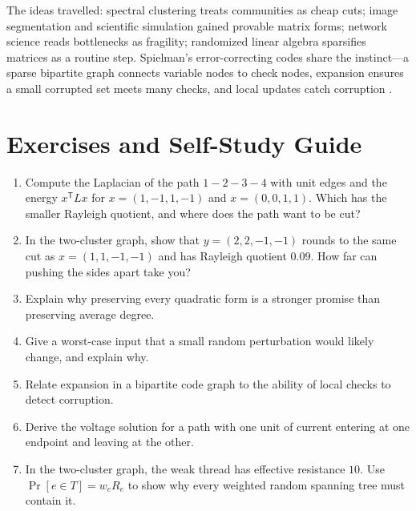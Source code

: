 The ideas travelled: spectral clustering treats communities as cheap cuts; image segmentation and scientific simulation gained provable matrix forms; network science reads bottlenecks as fragility; randomized linear algebra sparsifies matrices as a routine step. Spielman's error-correcting codes share the instinct---a sparse bipartite graph connects variable nodes to check nodes, expansion ensures a small corrupted set meets many checks, and local updates catch corruption \cite{spielman-smoothed,spielman-laplacian,spielman-codes}.

\section{Exercises and Self-Study Guide}
\begin{enumerate}[label=\textbf{E\arabic*.}]
\item Compute the Laplacian of the path $1-2-3-4$ with unit edges and the energy $x^{\mathsf T}Lx$ for $x=(1,-1,1,-1)$ and $x=(0,0,1,1)$. Which has the smaller Rayleigh quotient, and where does the path want to be cut?
\item In the two-cluster graph, show that $y=(2,2,-1,-1)$ rounds to the same cut as $x=(1,1,-1,-1)$ and has Rayleigh quotient $0.09$. How far can pushing the sides apart take you?
\item Explain why preserving every quadratic form is a stronger promise than preserving average degree.
\item Give a worst-case input that a small random perturbation would likely change, and explain why.
\item Relate expansion in a bipartite code graph to the ability of local checks to detect corruption.
\item Derive the voltage solution for a path with one unit of current entering at one endpoint and leaving at the other.
\item In the two-cluster graph, the weak thread has effective resistance $10$. Use $\Pr[e\in T]=w_eR_e$ to show why every weighted random spanning tree must contain it.
\end{enumerate}

\clearpage
